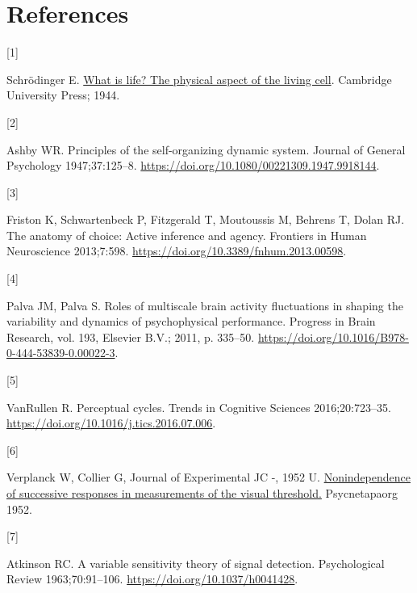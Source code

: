 \documentclass[
]{article}
\newlength{\cslhangindent}
\newlength{\csllabelwidth}
\newlength{\cslentryspacingunit} %
\newenvironment{CSLReferences}[2] %
 {%
  \setlength{\parindent}{0pt}
  \ifodd #1
  \let\oldpar\par
  \def\par{\hangindent=\cslhangindent\oldpar}
  \fi
  \setlength{\parskip}{#2\cslentryspacingunit}
 }%
 {}
\newcommand{\CSLLeftMargin}[1]{\parbox[t]{\csllabelwidth}{#1}}
\newcommand{\CSLRightInline}[1]{\parbox[t]{\linewidth - \csllabelwidth}{#1}\break}
\begin{document}
\newpage

\hypertarget{references}{%
\section*{References}\label{references}}

\hypertarget{refs}{}
\begin{CSLReferences}{0}{0}
\leavevmode{}%
\CSLLeftMargin{{[}1{]} }%
\CSLRightInline{Schrödinger E.
\href{http://filf.pskgu.ru/ebooks/schbio/schbio_titul.pdf}{What is life?
The physical aspect of the living cell}. Cambridge University Press;
1944.}

\leavevmode{}%
\CSLLeftMargin{{[}2{]} }%
\CSLRightInline{Ashby WR. Principles of the self-organizing dynamic
system. Journal of General Psychology 1947;37:125--8.
\url{https://doi.org/10.1080/00221309.1947.9918144}.}

\leavevmode{}%
\CSLLeftMargin{{[}3{]} }%
\CSLRightInline{Friston K, Schwartenbeck P, Fitzgerald T, Moutoussis M,
Behrens T, Dolan RJ. The anatomy of choice: Active inference and agency.
Frontiers in Human Neuroscience 2013;7:598.
\url{https://doi.org/10.3389/fnhum.2013.00598}.}

\leavevmode{}%
\CSLLeftMargin{{[}4{]} }%
\CSLRightInline{Palva JM, Palva S. Roles of multiscale brain activity
fluctuations in shaping the variability and dynamics of psychophysical
performance. Progress in Brain Research, vol. 193, Elsevier B.V.; 2011,
p. 335--50. \url{https://doi.org/10.1016/B978-0-444-53839-0.00022-3}.}

\leavevmode{}%
\CSLLeftMargin{{[}5{]} }%
\CSLRightInline{VanRullen R. Perceptual cycles. Trends in Cognitive
Sciences 2016;20:723--35.
\url{https://doi.org/10.1016/j.tics.2016.07.006}.}

\leavevmode{}%
\CSLLeftMargin{{[}6{]} }%
\CSLRightInline{Verplanck W, Collier G, Journal of Experimental JC -,
1952 U.
\href{https://psycnet.apa.org/record/1953-04864-001}{Nonindependence of
successive responses in measurements of the visual threshold.}
Psycnetapaorg 1952.}

\leavevmode{}%
\CSLLeftMargin{{[}7{]} }%
\CSLRightInline{Atkinson RC. A variable sensitivity theory of signal
detection. Psychological Review 1963;70:91--106.
\url{https://doi.org/10.1037/h0041428}.}


\end{CSLReferences}
\end{document}
